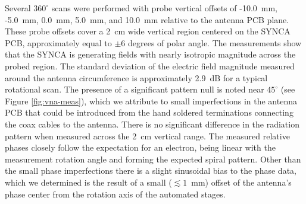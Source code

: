 Several $360^\circ$ scans were performed with probe vertical offsets of -10.0~mm, -5.0~mm, 0.0~mm, 5.0~mm, and 10.0~mm relative to the antenna PCB plane. These probe offsets cover a 2~cm wide vertical region centered on the SYNCA PCB, approximately equal to $\pm6$ degrees of polar angle. The measurements show that the SYNCA is generating fields with nearly isotropic magnitude across the probed region. The standard deviation of the electric field magnitude measured around the antenna circumference is approximately 2.9~dB for a typical rotational scan.
The presence of a significant pattern null is noted near $45^\circ$ (see Figure \ref{fig:vna-meas}), which we attribute to small imperfections in the antenna PCB that could be introduced from the hand soldered terminations connecting the coax cables to the antenna. There is no significant difference in the radiation pattern when measured across the 2~cm vertical range. The measured relative phases closely follow the expectation for an electron, being linear with the measurement rotation angle and forming the expected spiral pattern. Other than the small phase imperfections there is a slight sinusoidal bias to the phase data, which we determined is the result of a small ($\lesssim 1$~mm) offset of the antenna's phase center from the rotation axis of the automated stages.

